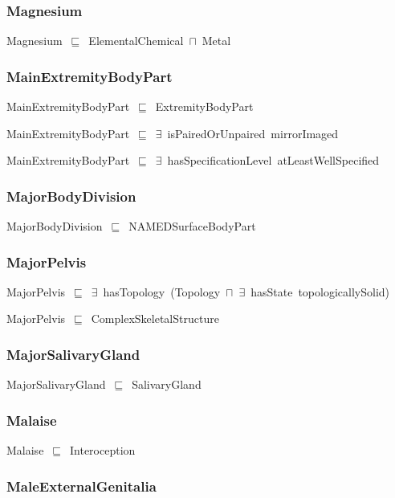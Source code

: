 \documentclass{article}
\begin{document}
\subsubsection*{Magnesium}

Magnesium~\ensuremath{\sqsubseteq}~ElementalChemical~\ensuremath{\sqcap}~Metal~

\subsubsection*{MainExtremityBodyPart}

MainExtremityBodyPart~\ensuremath{\sqsubseteq}~ExtremityBodyPart~

MainExtremityBodyPart~\ensuremath{\sqsubseteq}~\ensuremath{\exists}~isPairedOrUnpaired~mirrorImaged~

MainExtremityBodyPart~\ensuremath{\sqsubseteq}~\ensuremath{\exists}~hasSpecificationLevel~atLeastWellSpecified~

\subsubsection*{MajorBodyDivision}

MajorBodyDivision~\ensuremath{\sqsubseteq}~NAMEDSurfaceBodyPart~

\subsubsection*{MajorPelvis}

MajorPelvis~\ensuremath{\sqsubseteq}~\ensuremath{\exists}~hasTopology~(Topology~\ensuremath{\sqcap}~\ensuremath{\exists}~hasState~topologicallySolid)~

MajorPelvis~\ensuremath{\sqsubseteq}~ComplexSkeletalStructure~

\subsubsection*{MajorSalivaryGland}

MajorSalivaryGland~\ensuremath{\sqsubseteq}~SalivaryGland~

\subsubsection*{Malaise}

Malaise~\ensuremath{\sqsubseteq}~Interoception~

\subsubsection*{MaleExternalGenitalia}
\end{document}
